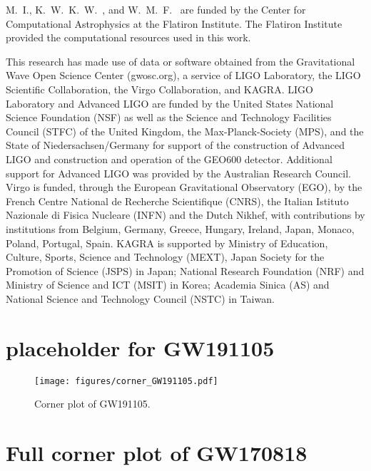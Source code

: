 \documentclass[aps,prd,twocolumn,superscriptaddress,preprintnumbers,floatfix,nofootinbib]{revtex4-2}
\begin{document}
\begin{acknowledgments}
M.~I., K.~W.~K.~W.~, and W.~M.~F.~ are funded by the Center for Computational Astrophysics at the Flatiron Institute.
The Flatiron Institute provided the computational resources used in this work.

This research has made use of data or software obtained from the Gravitational Wave Open Science Center (gwosc.org), a service of LIGO Laboratory, the LIGO Scientific Collaboration, the Virgo Collaboration, and KAGRA.
LIGO Laboratory and Advanced LIGO are funded by the United States National Science Foundation (NSF) as well as the Science and Technology Facilities Council (STFC) of the United Kingdom, the Max-Planck-Society (MPS), and the State of Niedersachsen/Germany for support of the construction of Advanced LIGO and construction and operation of the GEO600 detector.
Additional support for Advanced LIGO was provided by the Australian Research Council.
Virgo is funded, through the European Gravitational Observatory (EGO), by the French Centre National de Recherche Scientifique (CNRS), the Italian Istituto Nazionale di Fisica Nucleare (INFN) and the Dutch Nikhef, with contributions by institutions from Belgium, Germany, Greece, Hungary, Ireland, Japan, Monaco, Poland, Portugal, Spain.
KAGRA is supported by Ministry of Education, Culture, Sports, Science and Technology (MEXT), Japan Society for the Promotion of Science (JSPS) in Japan; National Research Foundation (NRF) and Ministry of Science and ICT (MSIT) in Korea; Academia Sinica (AS) and National Science and Technology Council (NSTC) in Taiwan.
\end{acknowledgments}

\appendix

\section{placeholder for GW191105}

\begin{figure}[h]
    \texttt{[image: figures/corner\_GW191105.pdf]}
    \caption{
        Corner plot of GW191105.
    }
    \label{fig:corner_GW191105}
\end{figure}

\section{Full corner plot of GW170818}
\label{sec:corner_GW170818_appendix}
\end{document}
